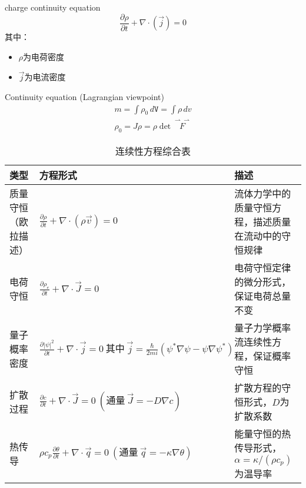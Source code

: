 \documentclass[12pt, a4paper, oneside, UTF8]{ctexbook}  %
\newcommand{\pa}{\partial}
\newcommand{\vvec}{\overset{\rightharpoonup\!\!\!\! \rightharpoonup}}
\begin{document}
\begin{example}
	charge continuity equation
	\[\frac{\pa \rho}{\pa t}+\nabla\cdot(\vec{j})=0\]
	其中：
	\begin{itemize}
		\item $\rho$为电荷密度
		\item $\vec{j}$为电流密度
	\end{itemize}
\end{example}
\begin{defn}
	Continuity equation	(Lagrangian viewpoint)
	\begin{gather*}
		m=\int \rho_0\,d\mathtt{V}=\int \rho\,dv\\
		\rho_0=J\rho=\rho\det\vvec{F}
	\end{gather*}
\end{defn}
\begin{table}[h!t]
    \centering
    \caption{连续性方程综合表}
    \label{tab:combined_continuity}
    \setlength{\tabcolsep}{4pt}
    \begin{tabularx}{\textwidth}{ 
        >{\hsize=0.5\hsize\raggedright\arraybackslash}X 
        >{\hsize=1.6\hsize\raggedright\arraybackslash}X 
        >{\hsize=0.9\hsize\RaggedRight\arraybackslash}X 
    }
    \toprule
    \textbf{类型} & \textbf{方程形式} & \textbf{描述} \\
    \midrule
    质量守恒（欧拉描述） & 
    $\displaystyle \frac{\partial \rho}{\partial t} + \nabla \cdot (\rho \vec{v}) = 0$ & 
    流体力学中的质量守恒方程，描述质量在流动中的守恒规律 \\[8pt]
    
    电荷守恒 & 
    $\displaystyle \frac{\partial \rho_e}{\partial t} + \nabla \cdot \vec{J} = 0$ & 
    电荷守恒定律的微分形式，保证电荷总量不变 \\[8pt]
    
    量子概率密度 & 
    $\displaystyle \frac{\partial |\psi|^2}{\partial t} + \nabla \cdot \vec{j} = 0\ \text{其中}\ \vec{j} = \frac{\hbar}{2mi}(\psi^*\nabla\psi - \psi\nabla\psi^*)$ & 
    量子力学概率流连续性方程，保证概率守恒 \\[8pt]
    
    扩散过程 & 
    $\displaystyle \frac{\partial c}{\partial t} + \nabla \cdot \vec{J} = 0\ (\text{通量}\ \vec{J} = -D \nabla c)$ & 
    扩散方程的守恒形式，$ D $为扩散系数 \\[8pt]
    
    热传导 & 
    $\displaystyle \rho c_p \frac{\partial \theta}{\partial t} + \nabla \cdot \vec{q} = 0\ (\text{通量}\ \vec{q} = -\kappa \nabla \theta)$ & 
    能量守恒的热传导形式，$\alpha = \kappa / (\rho c_p)$为温导率 \\[8pt]


\end{tabularx}
\end{table}
\end{document}
